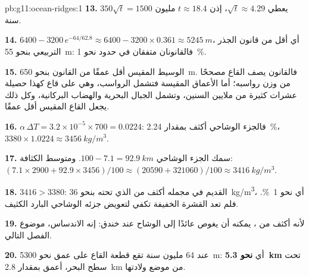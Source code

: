 \begin{solution}{pb:g11:ocean-ridges:1}
\textbf{13.} $350\sqrt{t} = 1500$ يعطي $\sqrt{t} \approx 4.29$، إذن
$t \approx 18.4$ مليون سنة.

\textbf{14.} $6400 - 3200\,e^{-64/62.8} \approx 6400 - 3200 \times 0.361
\approx \qty{5245}{m}$، أي أقل من قانون الجذر التربيعي بنحو \qty{55}{m}: فالقانونان
 متفقان في حدود نحو \qty{1}{\percent}.

\textbf{15.} الوسيط المقيس أقل عمقًا من القانون بنحو \qty{650}{m}.
فالقانون يصف القاع مصححًا من وزن رواسبه؛
أما الأعماق المقيسة فتشمل الرواسب، وهي على قاع كهذا حصيلة عشرات كثيرة من
ملايين السنين، وتشمل الجبال البحرية والهضاب البركانية، وكل ذلك يجعل
القاع المقيس أقل عمقًا.

\textbf{16.} $\alpha\,\Delta T = 3.2 \times 10^{-5} \times 700 = 0.0224$: فالجزء
الوشاحي أكثف بمقدار \qty{2.24}{\percent}،
$3380 \times 1.0224 \approx \qty{3456}{kg/m^3}$.

\textbf{17.} سمك الجزء الوشاحي $100 - 7.1 = \qty{92.9}{km}$. ومتوسط
الكثافة: $(7.1 \times 2900 + 92.9 \times 3456)/100 \approx (20590 + 321060)/100
\approx \qty{3416}{kg/m^3}$.

\textbf{18.} $3416 > 3380$:  القديم في مجمله أكثف من
 الذي تحته بنحو \qty{36}{kg/m^3}، أي نحو \qty{1}{\percent}.
فلم تعد القشرة الخفيفة تكفي لتعويض جزئه الوشاحي البارد
الكثيف.

\textbf{19.} لأنه أكثف من ، يمكنه أن يغوص عائدًا إلى
الوشاح عند خندق: إنه الاندساس، موضوع الفصل التالي.

\textbf{20.} عند 64 مليون سنة تقع قطعة القاع على عمق نحو
\qty{5300}{m}: أي \textbf{نحو 5.3~\unit{km}} تحت سطح البحر، أعمق بمقدار \qty{2.8}{km} من موضع
ولادتها.
\end{solution}
